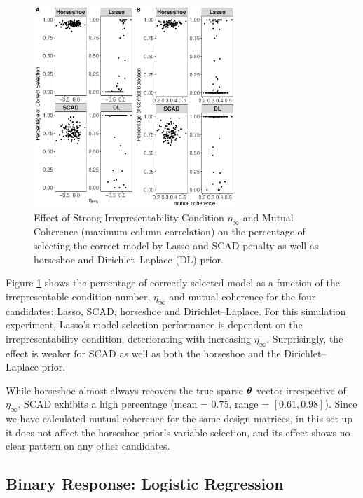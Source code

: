 \documentclass[sts,preprint]{imsart}
\begin{document}
\begin{figure}[ht!]%
\centering
\includegraphics[height = 3in, width=\columnwidth]{irrep_mc_effect_DL_100_100} %
\caption{Effect of Strong Irrepresentability Condition $\eta_{\infty}$ and Mutual Coherence
(maximum column correlation) on the percentage of selecting the correct model
by Lasso and SCAD penalty as well as horseshoe and Dirichlet--Laplace (DL) prior.}%
\label{fig:irrep-mc}%
\end{figure}

Figure \ref{fig:irrep-mc} shows the percentage of correctly selected model as a function of the irrepresentable condition number, $\eta_{\infty}$ and mutual coherence  for the four candidates: Lasso, SCAD, horseshoe and Dirichlet--Laplace. For this simulation experiment, Lasso's model selection performance is dependent on the irrepresentability condition, deteriorating with increasing $\eta_{\infty}$. Surprisingly, the effect is weaker for SCAD as well as both the horseshoe and the Dirichlet--Laplace prior. 

While horseshoe almost always recovers the true sparse $\boldsymbol{\theta}$ vector irrespective of $\eta_{\infty}$, SCAD exhibits a high percentage (mean = $0.75$, range = $[0.61, 0.98]$). Since we have calculated mutual coherence for the same design matrices, in this set-up it does not affect the horseshoe prior's variable selection, and its effect shows no clear pattern on any other candidates. 

\subsection{Binary Response: Logistic Regression}
\end{document}

